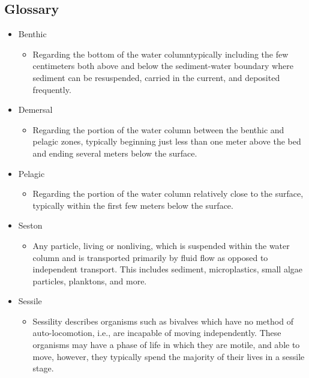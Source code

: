 \documentclass[fleqn,10pt]{SelfArx} %
\begin{document}
	
	\subsection{Glossary}
	
	\begin{itemize}
		\item Benthic
		\begin{itemize}
			\item Regarding the bottom of the water column\textemdash typically including the few centimeters both above and below the sediment-water boundary where sediment can be resuspended, carried in the current, and deposited frequently. 
			
		\end{itemize}
		
		
		\item Demersal
		\begin{itemize}
			\item Regarding the portion of the water column between the benthic and pelagic zones, typically beginning just less than one meter above the bed and ending several meters below the surface.
			
		\end{itemize}
		
		\item Pelagic
		\begin{itemize}
			\item Regarding the portion of the water column relatively close to the surface, typically within the first few meters below the surface.
			
		\end{itemize}
		
		\item Seston
		\begin{itemize}
			\item Any particle, living or nonliving, which is suspended within the water column and is transported primarily by fluid flow as opposed to independent transport. This includes sediment, microplastics, small algae particles, planktons, and more.
			
		\end{itemize}
		
		\item Sessile
		\begin{itemize}
			\item Sessility describes organisms such as bivalves which have no method of auto-locomotion, i.e., are incapable of moving independently. These organisms may have a phase of life in which they are motile, and able to move, however, they typically spend the majority of their lives in a sessile stage.
			

\end{itemize}
\end{itemize}
\end{document}
